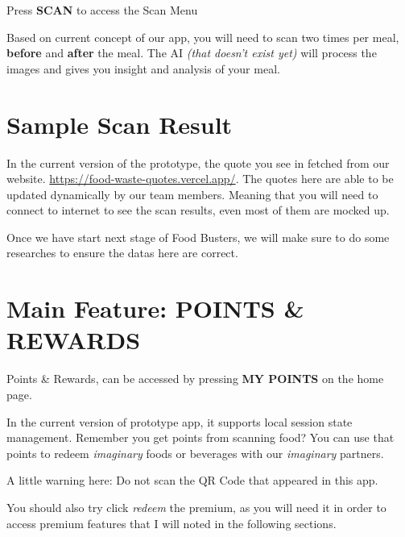 \documentclass[a4paper,12pt]{article}
\begin{document}
Press \textbf{SCAN} to access the Scan Menu


Based on current concept of our app, you will need to scan two times per meal,
\textbf{before} and \textbf{after} the meal. The AI \textit{(that doesn't exist yet)} will
process the images and gives you insight and analysis of your meal.

\pagebreak
\section*{Sample Scan Result}


In the current version of the prototype, the quote you see in fetched from our
website. \href{https://food-waste-quotes.vercel.app/}{https://food-waste-quotes.vercel.app/}.
The quotes here are able to be updated dynamically by our team members. Meaning that
you will need to connect to internet to see the scan results, even most of them
are mocked up.

Once we have start next stage of Food Busters, we will make sure to do some
researches to ensure the datas here are correct.


\pagebreak
\section{Main Feature: POINTS \& REWARDS}

Points \& Rewards, can be accessed by pressing \textbf{MY POINTS} on the home page.


In the current version of prototype app, it supports local session state management.
Remember you get points from scanning food? You can use that points to redeem
\textit{imaginary} foods or beverages with our \textit{imaginary} partners.

A little warning here: Do not scan the QR Code that appeared in this app.

You should also try click \textit{redeem} the premium, as you will need it
in order to access premium features that I will noted in the following sections.
\end{document}
